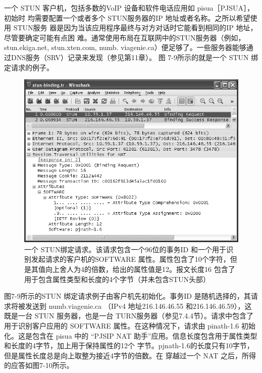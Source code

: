 一个 STUN 客户机，包括多数的VoIP 设备和软件电话应用如 pisua［PJSUA］，初始时
均需要配置一个或者多个 STUN服务器的IP 地址或者名称。之所以希望使用 STUN服务
器是因为当该应用程序最终与对方对话时它能看到相同的IP 地址，尽管要确定可能有点困
难。通常使用布局在互联网中的STUN服务器（例如，stun.ekiga.net, stun.xten.com, numb.
viagenie.ca）便足够了。一些服务器能够通过DNS服务（SRV）记录来发现（参见第11章）。
图 7-9所示的就是一个 STUN 绑定请求的例子。

\begin{figure}[H]
    \centering
	\includegraphics[scale=0.7]{imgs/7/7-9.png}
	\caption{一个 STUN绑定请求。该请求包含一个96位的事务ID 和一个用于识别发起请求的客户机的SOFTWARE 属性。属性包含了10个字符，但是其值向上舍人为4的倍数，给出的属性值是12。报文长度16 包含了用于包含属性类型和长度的4个字节（并未包含STUN头部）}
\end{figure}

图7-9所示的STUN 绑定请求例子由客户机先初始化。事务ID 是随机选择的，其请
求将被发送到 numb.viagenie.ca （IPv4 地址216.146.46.55 和216.146.46.59），这既是一台
STUN 服务器，也是一台 TURN服务器（参见7.4.4节）。请求中包含了用于识别客户应用的
SOFTWARE 属性。在这种情况下，请求由 pinath-1.6 初始化。这是包含在 pisua 中的 “PJSIP
NAT 助手”应用。信息长度包含用于属性类型和长度的4字节，加上用于保持属性的12个
字节。pjnath-1.6的长度只有10字节，但是属性长度总是向上取整为接近4字节的倍数。在
穿越过一个 NAT 之后，所得的应答如图7-10所示。

